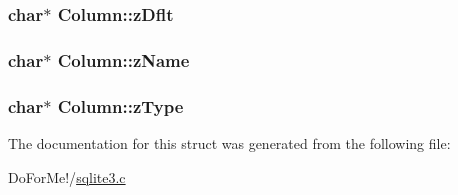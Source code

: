 \hypertarget{struct_column_a88d29c685783cddfbd039e5674990f4b}{
\subsubsection[{z\-Dflt}]{\setlength{\rightskip}{0pt plus 5cm}char$\ast$ Column\-::z\-Dflt}}\label{struct_column_a88d29c685783cddfbd039e5674990f4b}
\hypertarget{struct_column_a6450a4e9fde68b3a2d79425d826eccc3}{
\subsubsection[{z\-Name}]{\setlength{\rightskip}{0pt plus 5cm}char$\ast$ Column\-::z\-Name}}\label{struct_column_a6450a4e9fde68b3a2d79425d826eccc3}
\hypertarget{struct_column_aef09f43479c4bd2d07f77d340020f95f}{
\subsubsection[{z\-Type}]{\setlength{\rightskip}{0pt plus 5cm}char$\ast$ Column\-::z\-Type}}\label{struct_column_aef09f43479c4bd2d07f77d340020f95f}


The documentation for this struct was generated from the following file\-:\begin{DoxyCompactItemize}
\item 
Do\-For\-Me!/\hyperlink{sqlite3_8c}{sqlite3.\-c}\end{DoxyCompactItemize}
